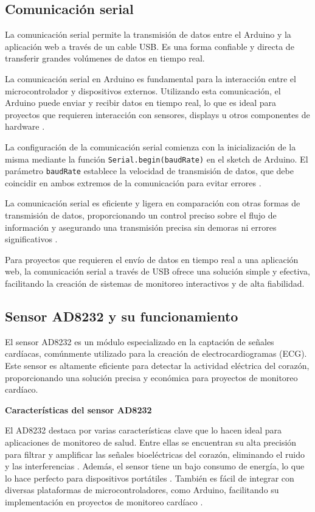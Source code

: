 \subsection{Comunicación serial}

La comunicación serial permite la transmisión de datos entre el Arduino y la aplicación web a través de un cable USB. Es una forma confiable y directa de transferir grandes volúmenes de datos en tiempo real.

La comunicación serial en Arduino es fundamental para la interacción entre el microcontrolador y dispositivos externos. Utilizando esta comunicación, el Arduino puede enviar y recibir datos en tiempo real, lo que es ideal para proyectos que requieren interacción con sensores, displays u otros componentes de hardware \cite{TechZero2024}.

La configuración de la comunicación serial comienza con la inicialización de la misma mediante la función \texttt{Serial.begin(baudRate)} en el sketch de Arduino. El parámetro \texttt{baudRate} establece la velocidad de transmisión de datos, que debe coincidir en ambos extremos de la comunicación para evitar errores \cite{DeepBluEmbedded2024}.

La comunicación serial es eficiente y ligera en comparación con otras formas de transmisión de datos, proporcionando un control preciso sobre el flujo de información y asegurando una transmisión precisa sin demoras ni errores significativos \cite{TechZero2024}.

Para proyectos que requieren el envío de datos en tiempo real a una aplicación web, la comunicación serial a través de USB ofrece una solución simple y efectiva, facilitando la creación de sistemas de monitoreo interactivos y de alta fiabilidad.

\subsection{Sensor AD8232 y su funcionamiento}

El sensor AD8232 es un módulo especializado en la captación de señales cardíacas, comúnmente utilizado para la creación de electrocardiogramas (ECG). Este sensor es altamente eficiente para detectar la actividad eléctrica del corazón, proporcionando una solución precisa y económica para proyectos de monitoreo cardíaco.

\textbf{Características del sensor AD8232}

El AD8232 destaca por varias características clave que lo hacen ideal para aplicaciones de monitoreo de salud. Entre ellas se encuentran su alta precisión para filtrar y amplificar las señales bioeléctricas del corazón, eliminando el ruido y las interferencias \cite{AD8232_teoria}. Además, el sensor tiene un bajo consumo de energía, lo que lo hace perfecto para dispositivos portátiles \cite{SparkFun_AD8232}. También es fácil de integrar con diversas plataformas de microcontroladores, como Arduino, facilitando su implementación en proyectos de monitoreo cardíaco \cite{liaw2002classification}.

